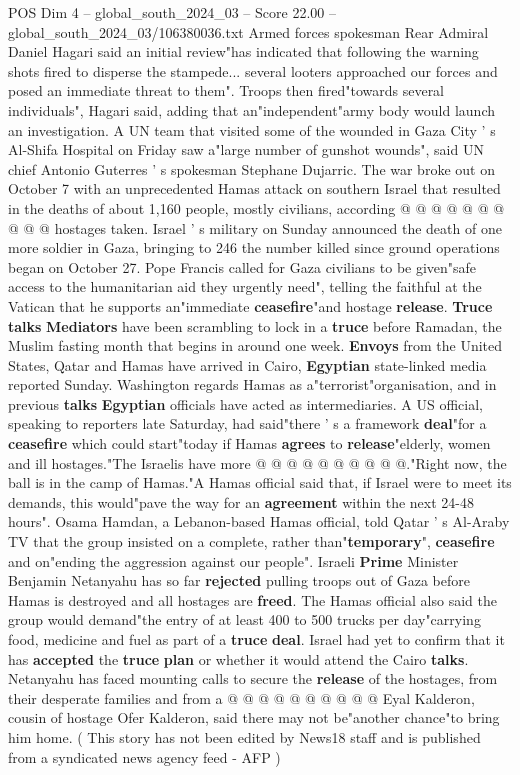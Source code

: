 \begin{textsample}{POS Dim 4 – global\_south\_2024\_03 – Score 22.00 – global\_south\_2024\_03/106380036.txt}
Armed forces spokesman Rear Admiral Daniel Hagari said an initial review"has indicated that following the warning shots fired to disperse the stampede... several looters approached our forces and posed an immediate threat to them".
Troops then fired"towards several individuals", Hagari said, adding that an"independent"army body would launch an investigation.
A UN team that visited some of the wounded in Gaza City ' s Al-Shifa Hospital on Friday saw a"large number of gunshot wounds", said UN chief Antonio Guterres ' s spokesman Stephane Dujarric.
The war broke out on October 7 with an unprecedented Hamas attack on southern Israel that resulted in the deaths of about 1,160 people, mostly civilians, according @ @ @ @ @ @ @ @ @ @ hostages taken.
Israel ' s military on Sunday announced the death of one more soldier in Gaza, bringing to 246 the number killed since ground operations began on October 27.
Pope Francis called for Gaza civilians to be given"safe access to the humanitarian aid they urgently need", telling the faithful at the Vatican that he supports an"immediate \textbf{ceasefire}"and hostage \textbf{release}. \textbf{Truce} \textbf{talks} \textbf{Mediators} have been scrambling to lock in a \textbf{truce} before Ramadan, the Muslim fasting month that begins in around one week. \textbf{Envoys} from the United States, Qatar and Hamas have arrived in Cairo, \textbf{Egyptian} state-linked media reported Sunday.
Washington regards Hamas as a"terrorist"organisation, and in previous \textbf{talks} \textbf{Egyptian} officials have acted as intermediaries.
A US official, speaking to reporters late Saturday, had said"there ' s a framework \textbf{deal}"for a \textbf{ceasefire} which could start"today if Hamas \textbf{agrees} to \textbf{release}"elderly, women and ill hostages."The Israelis have more @ @ @ @ @ @ @ @ @ @."Right now, the ball is in the camp of Hamas."A Hamas official said that, if Israel were to meet its demands, this would"pave the way for an \textbf{agreement} within the next 24-48 hours".
Osama Hamdan, a Lebanon-based Hamas official, told Qatar ' s Al-Araby TV that the group insisted on a complete, rather than"\textbf{temporary}", \textbf{ceasefire} and on"ending the aggression against our people".
Israeli \textbf{Prime} Minister Benjamin Netanyahu has so far \textbf{rejected} pulling troops out of Gaza before Hamas is destroyed and all hostages are \textbf{freed}.
The Hamas official also said the group would demand"the entry of at least 400 to 500 trucks per day"carrying food, medicine and fuel as part of a \textbf{truce} \textbf{deal}.
Israel had yet to confirm that it has \textbf{accepted} the \textbf{truce} \textbf{plan} or whether it would attend the Cairo \textbf{talks}.
Netanyahu has faced mounting calls to secure the \textbf{release} of the hostages, from their desperate families and from a @ @ @ @ @ @ @ @ @ @ Eyal Kalderon, cousin of hostage Ofer Kalderon, said there may not be"another chance"to bring him home. ( This story has not been edited by News18 staff and is published from a syndicated news agency feed - AFP )


\end{textsample}
